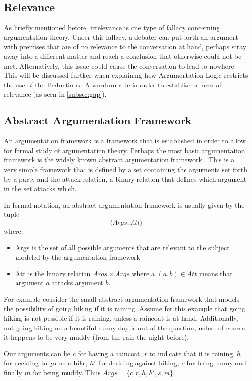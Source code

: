 \documentclass[11pt,twoside,a4paper]{report}
\begin{document}
\subsection{Relevance}
\label{subsec:relevance}
As briefly mentioned before, irrelevance is one type of fallacy concerning argumentation theory. Under this fallacy, a debater can put forth an argument with premises that are of no relevance to the conversation at hand, perhaps stray away into a different matter and reach a conclusion that otherwise could not be met. Alternatively, this issue could cause the conversation to lead to nowhere. This will be discussed further when explaining how Argumentation Logic restricts the use of the Reductio ad Absurdum rule in order to establish a form of relevance (as seen in \autoref{subsec:gap}).

\subsection{Abstract Argumentation Framework}
\label{subsec:abrstrargframework}
An argumentation framework is a framework that is established in order to allow for formal study of argumentation theory. Perhaps the most basic argumentation framework is the widely known abstract argumentation framework \citep*{dung95}. This is a very simple framework that is defined by a set containing the arguments set forth by a party and the attack relation, a binary relation that defines which argument in the set attacks which.

In formal notation, an abstract argumentation framework is usually given by the tuple
\[\langle Args, Att\rangle\]
where:
\begin{itemize}
\item
Args is the set of all possible arguments that are relevant to the subject modeled by the argumentation framework
\item
Att is the binary relation $Args\times Args$ where a $(a, b)\in Att$ means that argument $a$ attacks argument $b$.
\end{itemize}

For example consider the small abstract argumentation framework that models the possibility of going hiking if it is raining. Assume for this example that going hiking is not possible if it is raining, unless a raincoat is at hand. Additionally, not going hiking on a beautiful sunny day is out of the question, unless of course it happens to be very muddy (from the rain the night before).

Our arguments can be $c$ for having a raincoat, $r$ to indicate that it is raining, $h$ for deciding to go on a hike, $h'$ for deciding against hiking, $s$ for being sunny and finally $m$ for being muddy. Thus $Args = \{c, r, h, h', s, m\}$.
\end{document}
